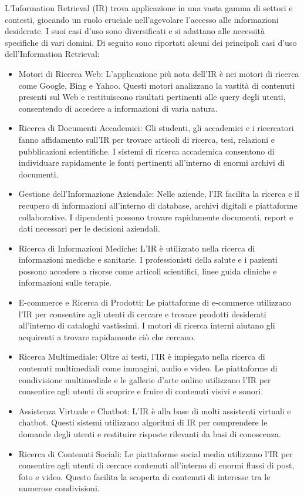 L'Information Retrieval (IR) trova applicazione in una vasta gamma di settori e contesti, giocando un ruolo cruciale nell'agevolare l'accesso alle informazioni desiderate. I suoi casi d'uso sono diversificati e si adattano alle necessità specifiche di vari domini. Di seguito sono riportati alcuni dei principali casi d'uso dell'Information Retrieval:

\begin{itemize}
    \item Motori di Ricerca Web: L'applicazione più nota dell'IR è nei motori di ricerca come Google, Bing e Yahoo. Questi motori analizzano la vastità di contenuti presenti sul Web e restituiscono risultati pertinenti alle query degli utenti, consentendo di accedere a informazioni di varia natura.
    \item Ricerca di Documenti Accademici: Gli studenti, gli accademici e i ricercatori fanno affidamento sull'IR per trovare articoli di ricerca, tesi, relazioni e pubblicazioni scientifiche. I sistemi di ricerca accademica consentono di individuare rapidamente le fonti pertinenti all'interno di enormi archivi di documenti.
    \item Gestione dell'Informazione Aziendale: Nelle aziende, l'IR facilita la ricerca e il recupero di informazioni all'interno di database, archivi digitali e piattaforme collaborative. I dipendenti possono trovare rapidamente documenti, report e dati necessari per le decisioni aziendali.
    \item Ricerca di Informazioni Mediche: L'IR è utilizzato nella ricerca di informazioni mediche e sanitarie. I professionisti della salute e i pazienti possono accedere a risorse come articoli scientifici, linee guida cliniche e informazioni sulle terapie.
    \item E-commerce e Ricerca di Prodotti: Le piattaforme di e-commerce utilizzano l'IR per consentire agli utenti di cercare e trovare prodotti desiderati all'interno di cataloghi vastissimi. I motori di ricerca interni aiutano gli acquirenti a trovare rapidamente ciò che cercano.
    \item Ricerca Multimediale: Oltre ai testi, l'IR è impiegato nella ricerca di contenuti multimediali come immagini, audio e video. Le piattaforme di condivisione multimediale e le gallerie d'arte online utilizzano l'IR per consentire agli utenti di scoprire e fruire di contenuti visivi e sonori.
    \item Assistenza Virtuale e Chatbot: L'IR è alla base di molti assistenti virtuali e chatbot. Questi sistemi utilizzano algoritmi di IR per comprendere le domande degli utenti e restituire risposte rilevanti da basi di conoscenza.
    \item Ricerca di Contenuti Sociali: Le piattaforme social media utilizzano l'IR per consentire agli utenti di cercare contenuti all'interno di enormi flussi di post, foto e video. Questo facilita la scoperta di contenuti di interesse tra le numerose condivisioni.
 
\end{itemize}

